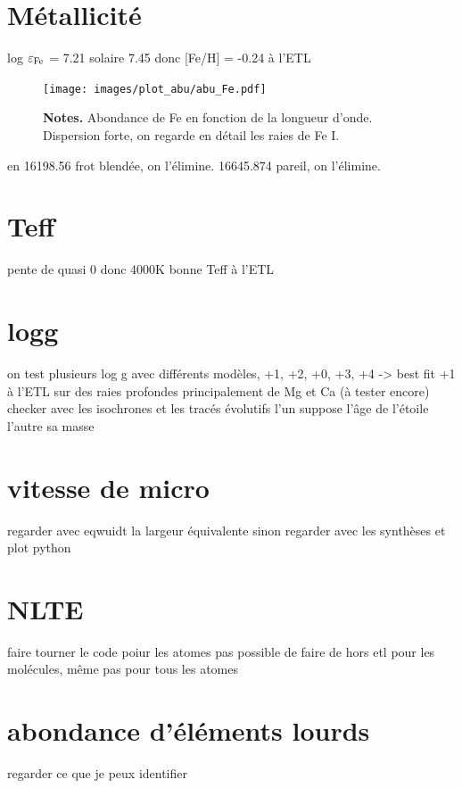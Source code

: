 \documentclass{article}
\begin{document}
\section{Métallicité}

log $\varepsilon_{\rm Fe}$ = 7.21
solaire 7.45 
donc [Fe/H] = -0.24 à l'ETL 

\begin{figure}[htbp]
  \begin{center}
  \texttt{[image: images/plot\_abu/abu\_Fe.pdf]}
  \end{center}
  \textbf{Notes.}  Abondance de Fe en fonction de la longueur d'onde. Dispersion forte, on regarde en détail les raies de Fe I.
  \label{fig:abu_Fe}
\end{figure}
en 16198.56 frot blendée, on l'élimine.
16645.874 pareil, on l'élimine.

\section{Teff}
pente de quasi 0 donc 4000K bonne Teff à l'ETL 



\section{logg}
on test plusieurs log g avec différents modèles, +1, +2, +0, +3, +4 -> best fit +1 à l'ETL 
sur des raies profondes principalement de Mg et Ca (à tester encore)
checker avec les isochrones et les tracés évolutifs 
l'un suppose l'âge de l'étoile l'autre sa masse



\section{vitesse de micro}
regarder avec eqwuidt la largeur équivalente sinon regarder avec les synthèses et plot python

\section{NLTE}
faire tourner le code poiur les atomes
pas possible de faire de hors etl pour les molécules, même pas pour tous les atomes
\section{abondance d'éléments lourds}
regarder ce que je peux identifier
\end{document}
